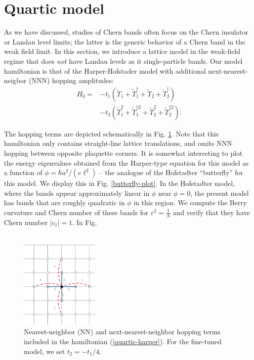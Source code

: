 \documentclass[aps,prb,twocolumn,letterpaper,twoside,nobalancelastpage,groupedaddress,amsmath,amssymb,floatfix,citeautoscript]{revtex4-1}
\begin{document}
\section{Quartic model}
As we have discussed, studies of Chern bands often focus on the Chern insulator or Landau level limits; the latter is the generic behavior of a Chern band in the weak field limit. In this section, we introduce a lattice model in the weak-field regime that does \textit{not} have Landau levels as it single-particle bands. Our model hamiltonian is that of the Harper-Hofstader model with additional next-nearest-neigbor (NNN) hopping amplitudes:
\begin{align}\
\label{quartic-harper}
H_0 = &-t_1 \left(\widetilde{T}_1 + \widetilde{T}_1^{\dag} + \widetilde{T}_2 + \widetilde{T}_2^{\dag}\right)\nonumber\\ &- t_2 \left(\widetilde{T}_1^{2} + \widetilde{T}_1^{\dag 2} + \widetilde{T}_2^{2} + \widetilde{T}_2^{\dag 2}\right).
\end{align}

The hopping terms are depicted schematically in Fig. \ref{hoppings}. Note that this hamiltonian only contains straight-line lattice translations, and omits NNN hopping between opposite plaquette corners. It is somewhat interesting to plot the energy eigenvalues obtained from the Harper-type equation for this model as a function of $\phi = \hbar a^2/(e \ell^2)$ -- the analogue of the Hofstadter ``butterfly'' for this model\cite{Hofstadter:1976js}. We display this in Fig. \ref{butterfly-plot}. In the Hofstadter model, where the bands appear approximately linear in $\phi$ near $\phi = 0$, the present model has bands that are roughly quadratic in $\phi$ in this region. We compute the Berry curvature and Chern number of these bands for $\varepsilon^2 = \frac{1}{N}$ and verify that they have Chern number $|c_1| = 1$. In Fig.

\begin{figure}[thb]
\centering
\includegraphics[width=1.5in]{quartic-hofstadter-hoppings-2.pdf}
\caption{\label{hoppings} Nearest-neighbor (NN) and next-nearest-neighbor hopping terms included in the hamiltonian (\ref{quartic-harper}). For the fine-tuned model, we set $t_2 = -t_1/4$.}
\end{figure}
\end{document}
